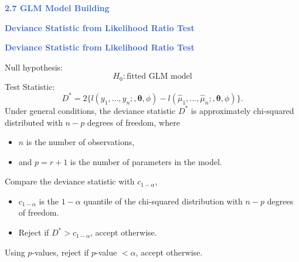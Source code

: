 \documentclass[aspectratio=169,professionalfonts,mathserif,handout]{beamer}
\newcommand{\highlight}[1]{\textcolor{Highlight}{\bf #1}}
\renewcommand{\(}{\left(}
\renewcommand{\)}{\right)}
\renewcommand{\[}{\left[}
\renewcommand{\]}{\right]}
\newcommand{\mytitle}[1]{\vspace*{-1mm}%
  \centerline{\highlight{\Large #1}}\vspace*{3mm}}
\newenvironment{slidebox}{%
  \begin{minipage}[c][7.5cm][t]{14.4cm}\raggedright}{%
  \end{minipage}}
\begin{document}
\begin{frame}\begin{slidebox}
  \mytitle{2.7 GLM Model Building}
\end{slidebox}\end{frame}

\begin{frame}\begin{slidebox}
  \mytitle{Deviance Statistic from Likelihood Ratio Test}
\end{slidebox}\end{frame}


\begin{frame}\begin{slidebox}
  \mytitle{Deviance Statistic from Likelihood Ratio Test}
  Null hypothesis: 
  $$H_0: \text{fitted GLM model} $$
  \pause
  Test Statistic:
  \begin{equation*}
    D^* = 2 \{ l(y_1, \dots, y_n;, \bm{\theta}, \phi) - l(\hat{\mu}_1, \dots, \hat{\mu}_n;, \bm{\theta}, \phi)\}\text{.} 
  \end{equation*}
  \pause
  Under general conditions, the deviance statistic $D^*$ is approximately chi-squared distributed with $n-p$ degrees of freedom, where 
  \begin{itemize}
    \item  $n$ is the number of observations,
    \item  and $p = r + 1$ is the number of parameters in the model.
  \end{itemize}
  \pause
  Compare the deviance statistic with $c_{1-\alpha}$, 
  \begin{itemize}
    \item  $c_{1-\alpha}$ is the $1-\alpha$ quantile of the chi-squared distribution with $n-p$ degrees of freedom.
    \item  Reject if $D^* > c_{1-\alpha}$, accept otherwise.
  \end{itemize}
  \pause
  Using $p$-values, reject if $p$-value $< \alpha$, accept otherwise.

\end{slidebox}\end{frame}
\end{document}
